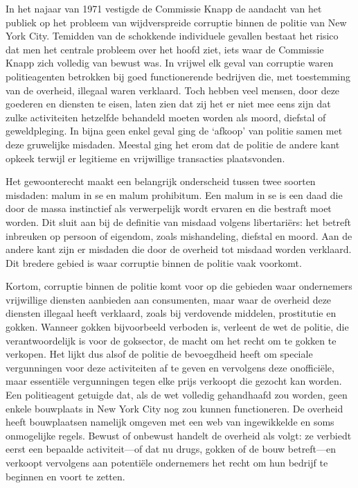 \documentclass[
  a5paper,
  smalldemyvopaper,10pt,twoside,onecolumn,openright,extrafontsizes,hidelinks]{memoir}
\begin{document}
In het najaar van 1971 vestigde de Commissie Knapp de aandacht van het
publiek op het probleem van wijdverspreide corruptie binnen de politie
van New York City. Temidden van de schokkende individuele gevallen
bestaat het risico dat men het centrale probleem over het hoofd ziet,
iets waar de Commissie Knapp zich volledig van bewust was. In vrijwel
elk geval van corruptie waren politieagenten betrokken bij goed
functionerende bedrijven die, met toestemming van de overheid, illegaal
waren verklaard. Toch hebben veel mensen, door deze goederen en diensten
te eisen, laten zien dat zij het er niet mee eens zijn dat zulke
activiteiten hetzelfde behandeld moeten worden als moord, diefstal of
geweldpleging. In bijna geen enkel geval ging de `afkoop' van politie
samen met deze gruwelijke misdaden. Meestal ging het erom dat de politie
de andere kant opkeek terwijl er legitieme en vrijwillige transacties
plaatsvonden.

Het gewoonterecht maakt een belangrijk onderscheid tussen twee soorten
misdaden: malum in se en malum prohibitum. Een malum in se is een daad
die door de massa instinctief als verwerpelijk wordt ervaren en die
bestraft moet worden. Dit sluit aan bij de definitie van misdaad volgens
libertariërs: het betreft inbreuken op persoon of eigendom, zoals
mishandeling, diefstal en moord. Aan de andere kant zijn er misdaden die
door de overheid tot misdaad worden verklaard. Dit bredere gebied is
waar corruptie binnen de politie vaak voorkomt.

Kortom, corruptie binnen de politie komt voor op die gebieden waar
ondernemers vrijwillige diensten aanbieden aan consumenten, maar waar de
overheid deze diensten illegaal heeft verklaard, zoals bij verdovende
middelen, prostitutie en gokken. Wanneer gokken bijvoorbeeld verboden
is, verleent de wet de politie, die verantwoordelijk is voor de
goksector, de macht om het recht om te gokken te verkopen. Het lijkt dus
alsof de politie de bevoegdheid heeft om speciale vergunningen voor deze
activiteiten af te geven en vervolgens deze onofficiële, maar essentiële
vergunningen tegen elke prijs verkoopt die gezocht kan worden. Een
politieagent getuigde dat, als de wet volledig gehandhaafd zou worden,
geen enkele bouwplaats in New York City nog zou kunnen functioneren. De
overheid heeft bouwplaatsen namelijk omgeven met een web van
ingewikkelde en soms onmogelijke regels. Bewust of onbewust handelt de
overheid als volgt: ze verbiedt eerst een bepaalde activiteit---of dat
nu drugs, gokken of de bouw betreft---en verkoopt vervolgens aan
potentiële ondernemers het recht om hun bedrijf te beginnen en voort te
zetten.
\end{document}
